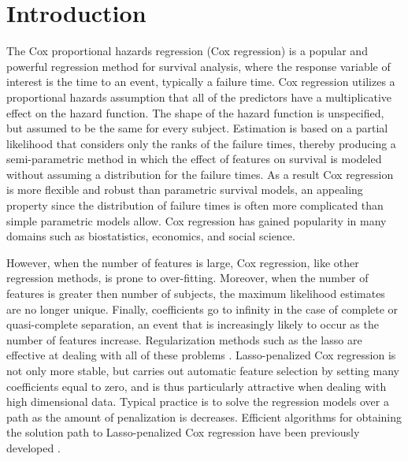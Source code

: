 
\section{Introduction}

The Cox proportional hazards regression (Cox regression) \citep{cox1972regression} is a popular and powerful regression method for survival analysis, where the response variable of interest is the time to an event, typically a failure time. Cox regression utilizes a proportional hazards assumption that all of the predictors have a multiplicative effect on the hazard function. The shape of the hazard function is unspecified, but assumed to be the same for every subject. Estimation is based on a partial likelihood that considers only the ranks of the failure times, thereby producing a semi-parametric method in which the effect of features on survival is modeled without assuming a distribution for the failure times. As a result Cox regression is more flexible and robust than parametric survival models, an appealing property since the distribution of failure times is often more complicated than simple parametric models allow. Cox regression has gained popularity in many domains such as biostatistics, economics, and social science.

However, when the number of features is large, Cox regression, like other regression methods, is prone to over-fitting. Moreover, when the number of features is greater then number of subjects, the maximum likelihood estimates are no longer unique. Finally, coefficients go to infinity in the case of complete or quasi-complete separation, an event that is increasingly likely to occur as the number of features increase. Regularization methods such as the lasso are effective at dealing with all of these problems \citep{tibshirani1997lasso}. Lasso-penalized Cox regression is not only more stable, but carries out automatic feature selection by setting many coefficients equal to zero, and is thus particularly attractive when dealing with high dimensional data. Typical practice is to solve the regression models over a path as the amount of penalization is decreases. Efficient algorithms for obtaining the solution path to Lasso-penalized Cox regression have been previously developed \citep{simon2011regularization}.

